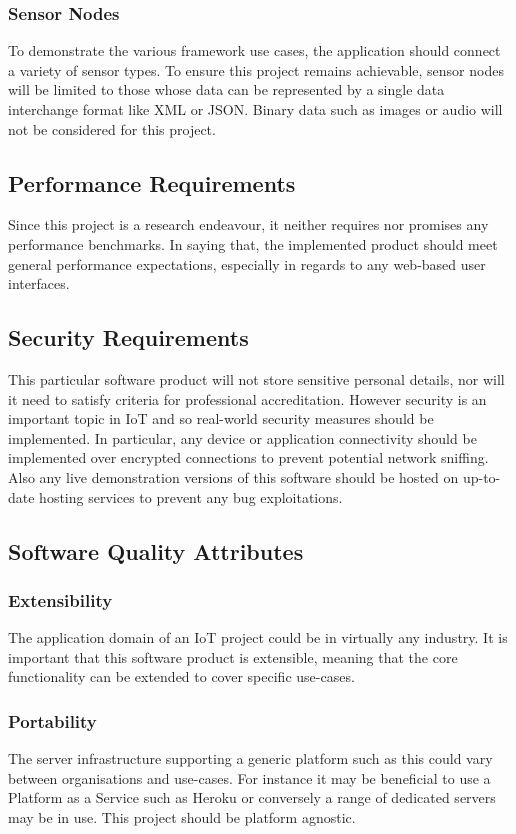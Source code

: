       \subsubsection{Sensor Nodes}
        To demonstrate the various framework use cases, the application should connect a variety of sensor types. To ensure this project remains achievable, sensor nodes will be limited to those whose data can be represented by a single data interchange format like XML or JSON. Binary data such as images or audio will not be considered for this project.

    \subsection{Performance Requirements}
      Since this project is a research endeavour, it neither requires nor promises any performance benchmarks. In saying that, the implemented product should meet general performance expectations, especially in regards to any web-based user interfaces.

    \subsection{Security Requirements}
      This particular software product will not store sensitive personal details, nor will it need to satisfy criteria for professional accreditation. However security is an important topic in IoT and so real-world security measures should be implemented. In particular, any device or application connectivity should be implemented over encrypted connections to prevent potential network sniffing. Also any live demonstration versions of this software should be hosted on up-to-date hosting services to prevent any bug exploitations.

    \subsection{Software Quality Attributes}
      \subsubsection{Extensibility}
        The application domain of an IoT project could be in virtually any industry. It is important that this software product is extensible, meaning that the core functionality can be extended to cover specific use-cases.

      \subsubsection{Portability}
        The server infrastructure supporting a generic platform such as this could vary between organisations and use-cases. For instance it may be beneficial to use a Platform as a Service such as Heroku or conversely a range of dedicated servers may be in use. This project should be platform agnostic. 

